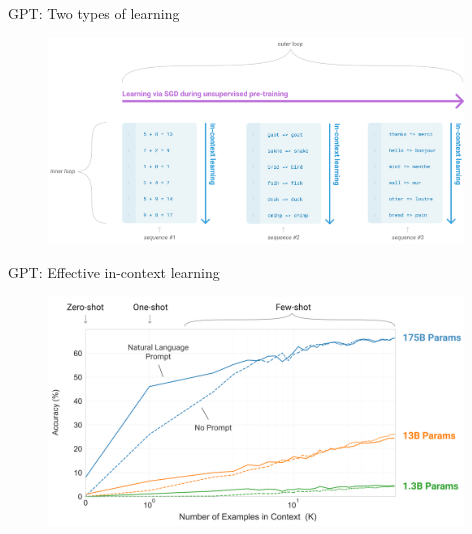 \begin{vbframe}{GPT: Two types of learning}

\vfill

\begin{figure}
		\centering
		\includegraphics[width=11cm]{figure/twotypesoflearning.png}
	\end{figure}

\vfill

\end{vbframe}


\begin{vbframe}{GPT: Effective in-context learning}

\vfill
			
	\begin{figure}
		\centering
		\includegraphics[width=11cm]{figure/incontextlearning.png}
	\end{figure}
\vfill

\end{vbframe}


